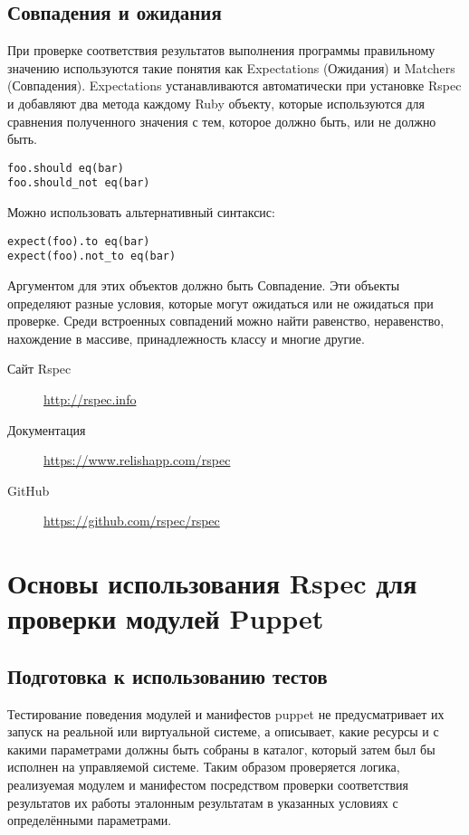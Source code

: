 \subsection{Совпадения и ожидания}

При проверке соответствия результатов выполнения программы правильному значению используются такие понятия как Expectations (Ожидания) и Matchers (Совпадения). Expectations устанавливаются автоматически при установке Rspec и добавляют два метода каждому Ruby объекту, которые используются для сравнения полученного значения с тем, которое должно быть, или не должно быть.

\begin{verbatim}
foo.should eq(bar)
foo.should_not eq(bar)
\end{verbatim}

Можно использовать альтернативный синтаксис:

\begin{verbatim}
expect(foo).to eq(bar)
expect(foo).not_to eq(bar) 
\end{verbatim}

Аргументом для этих объектов должно быть Совпадение. Эти объекты определяют разные условия, которые могут ожидаться или не ожидаться при проверке. Среди встроенных совпадений можно найти равенство, неравенство, нахождение в массиве, принадлежность классу и многие другие.

\begin{description}
\item[Сайт Rspec] \url{http://rspec.info}
\item[Документация] \url{https://www.relishapp.com/rspec}
\item[GitHub] \url{https://github.com/rspec/rspec}
\end{description}


\section{Основы использования Rspec для проверки модулей Puppet}

\subsection{Подготовка к использованию тестов}

Тестирование поведения модулей и манифестов puppet не предусматривает их запуск на реальной или виртуальной системе, а описывает, какие ресурсы и с какими параметрами должны быть собраны в каталог, который затем был бы исполнен на управляемой системе. Таким образом проверяется логика, реализуемая модулем и манифестом посредством проверки соответствия результатов их работы эталонным результатам в указанных условиях с определёнными параметрами.

